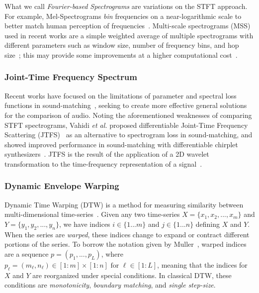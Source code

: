 \documentclass[lettersize,journal]{IEEEtran}
\providecommand{\gls}[1]{#1}
\begin{document}
What we call \textit{Fourier-based Spectrograms} are variations on the STFT approach. For example, Mel-Spectrograms \textit{bin} frequencies on a near-logarithmic scale to better match human perception of frequencies~\cite{muller2007dynamic}. Multi-scale spectrograms (\gls{MSS}) used in recent works are a simple weighted average of multiple spectrograms with different parameters such as window size, number of frequency bins, and hop size~\cite{engel2020ddsp,vahidi2023mesostructures}; this may provide some improvements at a higher computational cost~\cite{turian2020sorry,engel2020ddsp}.


\subsubsection{Joint-Time Frequency Spectrum}
Recent works have focused on the limitations of parameter and spectral loss functions in sound-matching~\cite{vahidi2023mesostructures,uzrad2024diffmoog}, seeking to create more effective general solutions for the comparison of audio. 
Noting the aforementioned weaknesses of comparing STFT spectrograms, Vahidi \textit{et al.} proposed differentiable Joint-Time Frequency Scattering (\gls{JTFS})~\cite{anden2015joint} as an alternative to spectrogram loss in sound-matching, and showed improved performance in sound-matching with differentiable chirplet synthesizers~\cite{vahidi2023mesostructures}. JTFS is the result of the application of a 2D wavelet transformation to the time-frequency representation of a signal~\cite{anden2015joint}. 

\subsubsection{Dynamic Envelope Warping}
Dynamic Time Warping (DTW) is a method for measuring similarity between multi-dimensional time-series~\cite{rabiner1993fundamentals,muller2007dynamic,giorgino2009computing}. Given any two time-series $X = \{x_1,x_2,...,x_m\}$ and $Y = \{y_1,y_2,...,y_n\}$, we have indices $i\in\{1...m\}$ and $j\in\{1...n\}$ defining $X$ and $Y$. When the series are \textit{warped}, these indices change to expand or contract different portions of the series. To borrow the notation given by Muller~\cite{muller2007dynamic}, warped indices are a sequence $p=(p_1,...,p_L)$, where \(p_\ell = (m_\ell, n_\ell) \in [1 : m] \times [1 : n] \text{ for } \ell \in [1 : L]\), meaning that the indices for $X$ and $Y$ are reorganized under special conditions. In classical DTW, these conditions are \textit{monotonicity}, \textit{boundary matching}, and \textit{single step-size}.
\end{document}
